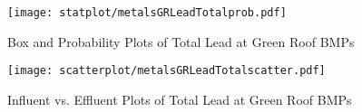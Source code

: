         \begin{figure}[hb]   %
            \centering
            \texttt{[image: statplot/metalsGRLeadTotalprob.pdf]}
            \caption{Box and Probability Plots of Total Lead at Green Roof BMPs}
        \end{figure}         %
        
        
        \begin{figure}[hb]   %
            \centering
            \texttt{[image: scatterplot/metalsGRLeadTotalscatter.pdf]}
            \caption{Influent vs. Effluent Plots of Total Lead at Green Roof BMPs}
        \end{figure}         %
        \clearpage
        